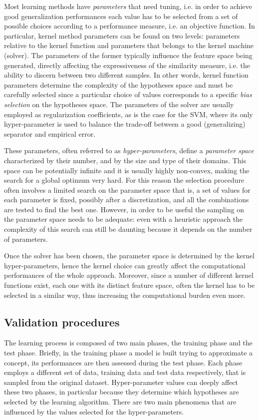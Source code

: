 Most learning methods have \emph{parameters} that need tuning, i.e. in order to achieve
good generalization performances each value has to be selected from a set of possible
choices according to a performance measure, i.e. an objective function.
In particular, kernel method parameters can be found on two levels:
parameters relative to the kernel function and parameters that belongs to the
kernel machine (solver).
The parameters of the former typically influence the feature space being generated,
directly affecting the expressiveness of the similarity measure, i.e. the ability
to discern between two different samples.
In other words, kernel function parameters determine the complexity of the hypotheses space
and must be carefully selected since a particular choice of values corresponds to
a specific \emph{bias selection} on the hypotheses space.
The parameters of the solver are usually employed as regularization coefficients, 
as is the case for the SVM, where its only hyper-parameter is used to balance the trade-off between a good
(generalizing) separator and empirical error.

These parameters, often referred to as \emph{hyper-parameters}, define a
\emph{parameter space} characterized by their number, and by the size and type
of their domains.
This space can be potentially infinite and it is usually highly non-convex, making
the search for a global optimum very hard.
For this reason the selection procedure often involves a limited search on the parameter space
that is, a set of values for each parameter is fixed, possibly after a discretization,
and all the combinations are tested to find the best one.
However, in order to be useful the sampling on the parameter space needs to be adequate:
even with a heuristic approach the complexity of this search can still be daunting because
it depends on the number of parameters.

Once the solver has been chosen, the parameter space is determined by the kernel
hyper-parameters, hence the kernel choice can greatly affect the computational
performances of the whole approach.
Moreover, since a number of different kernel functions exist, each one with its distinct
feature space, often the kernel has to be selected in a similar way, thus increasing the
computational burden even more.

\subsection{Validation procedures}
The learning process is composed of two main phases, the training phase and
the test phase.
Briefly, in the training phase a model is built trying to approximate a concept, its performances
are then assessed during the test phase.
Each phase employs a different set of data, training data and test data respectively,
that is sampled from the original dataset.
Hyper-parameter values can deeply affect these two phases, in particular
because they determine which hypotheses are selected by the learning algorithm.
There are two main phenomena that are influenced by the values selected for the
hyper-parameters.

